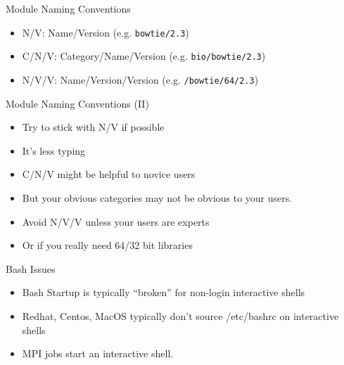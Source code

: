\documentclass[dvipsnames,aspectratio=169]{beamer}
\begin{document}
%

\begin{frame}{Module Naming Conventions}
  \begin{itemize}
    \item N/V:   Name/Version (e.g. \texttt{bowtie/2.3})
    \item C/N/V: Category/Name/Version (e.g. \texttt{bio/bowtie/2.3})
    \item N/V/V: Name/Version/Version (e.g. \texttt{/bowtie/64/2.3})
  \end{itemize}
\end{frame}

\begin{frame}{Module Naming Conventions (II)}
  \begin{itemize}
    \item Try to stick with N/V if possible
    \item It's less typing
    \item C/N/V might be helpful to novice users
    \item But your obvious categories may not be obvious to your users.
    \item Avoid N/V/V unless your users are experts 
    \item Or if you really need 64/32 bit libraries
  \end{itemize}
\end{frame}

\begin{frame}{Bash Issues}
  \begin{itemize}
    \item Bash Startup is typically ``broken'' for non-login
      interactive shells
    \item Redhat, Centos, MacOS typically don't source /etc/bashrc on
      interactive shells
    \item MPI jobs start an interactive shell.
  \end{itemize}
\end{frame}
\end{document}
